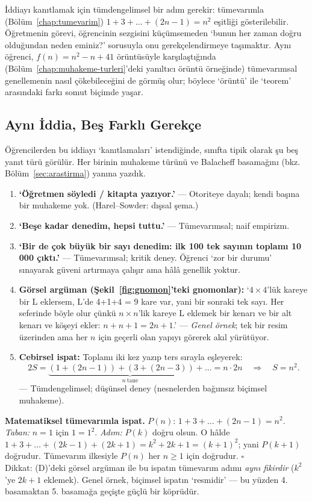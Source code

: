 İddiayı kanıtlamak için tümdengelimsel bir adım gerekir: tümevarımla (Bölüm~\ref{chap:tumevarim}) $1+3+\dots+(2n-1)=n^2$ eşitliği gösterilebilir. Öğretmenin görevi, öğrencinin sezgisini küçümsemeden ‘bunun her zaman doğru olduğundan neden eminiz?’ sorusuyla onu gerekçelendirmeye taşımaktır. Aynı öğrenci, $f(n)=n^2-n+41$ örüntüsüyle karşılaştığında (Bölüm~\ref{chap:muhakeme-turleri}’deki yanıltıcı örüntü örneğinde) tümevarımsal genellemenin nasıl çökebileceğini de görmüş olur; böylece ‘örüntü’ ile ‘teorem’ arasındaki farkı somut biçimde yaşar.

\subsection{Aynı İddia, Beş Farklı Gerekçe}

Öğrencilerden bu iddiayı ‘kanıtlamaları’ istendiğinde, sınıfta tipik olarak şu beş yanıt türü görülür. Her birinin muhakeme türünü ve Balacheff basamağını (bkz. Bölüm~\ref{sec:arastirma}) yanına yazdık.

\begin{enumerate}[leftmargin=1.6em,label=\textbf{(\Alph*)}]
\item \textbf{‘Öğretmen söyledi / kitapta yazıyor.’} — Otoriteye dayalı; kendi başına bir muhakeme yok. (Harel–Sowder: dışsal şema.)
\item \textbf{‘Beşe kadar denedim, hepsi tuttu.’} — Tümevarımsal; naif empirizm.
\item \textbf{‘Bir de çok büyük bir sayı denedim: ilk 100 tek sayının toplamı 10\,000 çıktı.’} — Tümevarımsal; kritik deney. Öğrenci ‘zor bir durumu’ sınayarak güveni artırmaya çalışır ama hâlâ genellik yoktur.
\item \textbf{Görsel argüman (Şekil~\ref{fig:gnomon}’teki gnomonlar):} ‘$4\times4$’lük kareye bir L eklersem, L’de 4+1+4 = 9 kare var, yani bir sonraki tek sayı. Her seferinde böyle olur çünkü $n\times n$’lik kareye L eklemek bir kenarı ve bir alt kenarı ve köşeyi ekler: $n+n+1=2n+1$.’ — \emph{Genel örnek}; tek bir resim üzerinden ama her $n$ için geçerli olan yapıyı görerek akıl yürütüyor.
\item \textbf{Cebirsel ispat:} Toplamı iki kez yazıp ters sırayla eşleyerek:
\[
2S=\underbrace{(1+(2n-1))+(3+(2n-3))+\dots}_{n\ \text{tane}}=n\cdot 2n\quad\Rightarrow\quad S=n^2.
\]
— Tümdengelimsel; düşünsel deney (nesnelerden bağımsız biçimsel muhakeme).
\end{enumerate}

\begin{coz}
\textbf{Matematiksel tümevarımla ispat.} $P(n)$: $1+3+\dots+(2n-1)=n^2$. \emph{Taban:} $n=1$ için $1=1^2$. \emph{Adım:} $P(k)$ doğru olsun. O hâlde $1+3+\dots+(2k-1)+(2k+1)=k^2+2k+1=(k+1)^2$; yani $P(k+1)$ doğrudur. Tümevarım ilkesiyle $P(n)$ her $n\ge1$ için doğrudur. $\square$ \\[3pt]
Dikkat: (D)’deki görsel argüman ile bu ispatın tümevarım adımı \emph{aynı fikirdir} ($k^2$’ye $2k+1$ eklemek). Genel örnek, biçimsel ispatın ‘resmidir’ — bu yüzden 4. basamaktan 5. basamağa geçişte güçlü bir köprüdür.
\end{coz}

